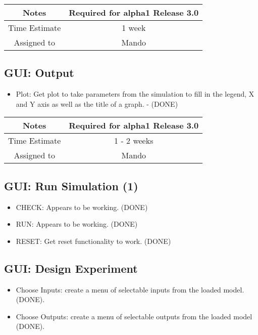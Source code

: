 \documentclass[12pt]{article}
\begin{document}
{
  \vspace{5mm}
  \centering
  \begin{tabular}{|c|c|}
    \hline
    Notes
    & Required for alpha1 Release 3.0 \\
    \hline
    Time Estimate
    & 1 week \\
    \hline
    Assigned to
    & Mando \\
    \hline
  \end{tabular}
}


\subsection{GUI: Output}
\begin{itemize}
\item Plot: Get plot to take parameters from the simulation to fill in
  the legend, X and Y axis as well as the title of a graph. - (DONE)
\end{itemize}

{
  \vspace{5mm}
  \centering
  \begin{tabular}{|c|c|}
    \hline
    Notes
    & Required for alpha1 Release 3.0 \\
    \hline
    Time Estimate
    & 1 - 2 weeks \\
    \hline
    Assigned to
    & Mando \\
    \hline
  \end{tabular}
}


\subsection{GUI: Run Simulation (1)}
\begin{itemize}
\item CHECK: Appears to be working. (DONE)
\item RUN: Appears to be working. (DONE)      
\item RESET: Get reset functionality to work. (DONE)
\end{itemize}


\subsection{GUI: Design Experiment}
\begin{itemize}
\item Choose Inputs: create a menu of selectable inputs from the
  loaded model. (DONE).
\item Choose Outputs: create a menu of selectable outputs from the
  loaded model (DONE).
\end{itemize}
\end{document}
